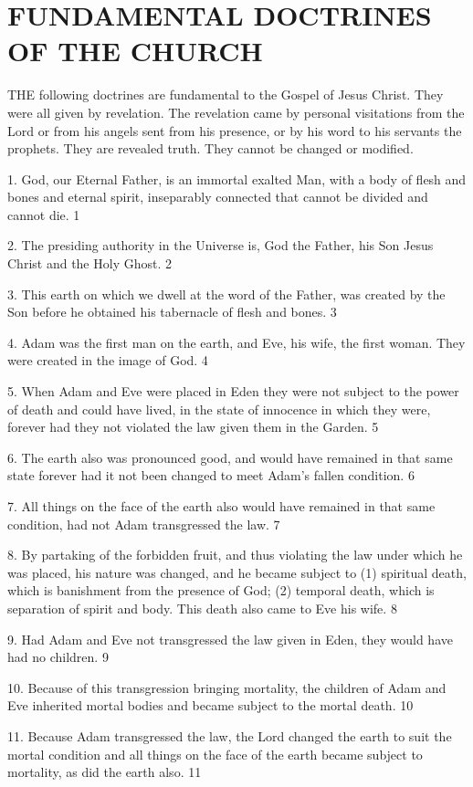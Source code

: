 \chapter{FUNDAMENTAL DOCTRINES OF THE CHURCH}

THE following doctrines are fundamental to the Gospel of Jesus Christ. They were all given
by revelation. The revelation came by personal visitations from the Lord or from his angels
sent from his presence, or by his word to his servants the prophets. They are revealed truth.
They cannot be changed or modified.

1. God, our Eternal Father, is an immortal exalted Man, with a body of flesh and bones and
eternal spirit, inseparably connected that cannot be divided and cannot die. 1

2. The presiding authority in the Universe is, God the Father, his Son Jesus Christ and the
Holy Ghost. 2

3. This earth on which we dwell at the word of the Father, was created by the Son before he
obtained his tabernacle of flesh and bones. 3

4. Adam was the first man on the earth, and Eve, his wife, the first woman. They were
created in the image of God. 4

5. When Adam and Eve were placed in Eden they were not subject to the power of death and
could have lived, in the state of innocence in which they were, forever had they not violated
the law given them in the Garden. 5

6. The earth also was pronounced good, and would have remained in that same state forever
had it not been changed to meet Adam's fallen condition. 6

7. All things on the face of the earth also would have remained in that same condition, had
not Adam transgressed the law. 7

8. By partaking of the forbidden fruit, and thus violating the law under which he was placed,
his nature was changed, and he became subject to (1) spiritual death, which is banishment
from the presence of God; (2) temporal death, which is separation of spirit and body. This
death also came to Eve his wife. 8

9. Had Adam and Eve not transgressed the law given in Eden, they would have had no
children. 9

10. Because of this transgression bringing mortality, the children of Adam and Eve inherited
mortal bodies and became subject to the mortal death. 10

11. Because Adam transgressed the law, the Lord changed the earth to suit the mortal
condition and all things on the face of the earth became subject to mortality, as did the earth
also. 11

